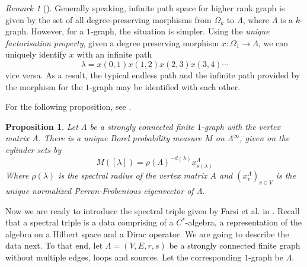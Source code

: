\documentclass{amsart}
\theoremstyle{plain}
\newtheorem{proposition}[subsection]{Proposition}
\theoremstyle{definition}
\theoremstyle{remark}
\newtheorem{remark}[subsection]{Remark}
\numberwithin{equation}{section}
\begin{document}
\begin{remark}[\cite{kumjian-pask}]
    Generally speaking, infinite path space for higher rank graph is given by the set of all degree-preserving morphisms from $\Omega_{k}$ to $\Lambda$, where $\Lambda$ is a $k$-graph. However, for a $1$-graph, the situation is simpler. Using the \textit{unique factorisation property}, given a degree preserving morphism $x:\Omega_{1}\rightarrow \Lambda$, we can uniquely identify $x$ with an infinite path $$\lambda=x(0,1)x(1,2)x(2,3)x(3,4)\cdots$$ 
 vice versa. As a result, the typical endless path and the infinite path provided by the morphism for the $1$-graph may be identified with each other.
\end{remark} 
For the following proposition, see \cite{farsi}.
\begin{proposition}
\label{unique KMS state}
    Let $\Lambda$ be a strongly connected finite $1$-graph with the vertex matrix $A$. There is a unique Borel probability measure $M$ on $\Lambda^{\infty}$, given on the cylinder sets by 
\begin{equation*}
    M([\lambda])=\rho(\Lambda)^{-d(\lambda)}x_{s(\lambda)}^{\Lambda}
\end{equation*}
Where $\rho(\lambda)$ is the spectral radius of the vertex matrix $A$ and $(x_{v}^{\Lambda})_{v\in V}$ is the unique normalized Perron-Frobenious eigenvector of $\Lambda$.
\end{proposition}
Now we are ready to introduce the spectral triple given by Farsi et al. in \cite{farsi}. Recall that a spectral triple is a data comprising of a $C^{\ast}$-algebra, a representation of the algebra on a Hilbert space and a Dirac operator. We are going to describe the data next. To that end, let $\Lambda=(V,E,r,s)$ be a strongly connected finite graph without multiple edges, loops and sources. Let the corresponding $1$-graph be $\Lambda$.
\end{document}
